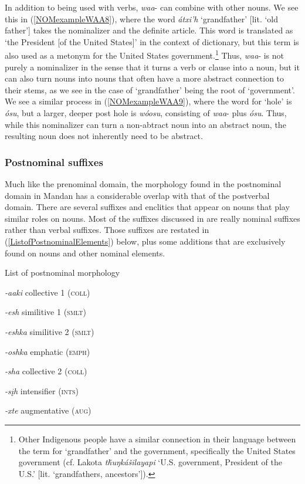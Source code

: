 In addition to being used with verbs, \textit{waa}- can combine with other nouns. We see this in (\ref{NOMexampleWAA8}), where the word \textit{átxi'h} `grandfather' [lit. `old father'] takes the nominalizer and the definite article. This word is translated as `the President [of the United States]' in the context of  dictionary, but this term is also used as a metonym for the United States government.\footnote{Other Indigenous people have a similar connection in their language between the term for `grandfather' and the government, specifically the United States government (cf. Lakota \textit{tȟuŋkášilayapi} `U.S. government, President of the U.S.' [lit. `grandfathers, ancestors']).} Thus, \textit{waa}- is not purely a nominalizer in the sense that it turns a verb or clause into a noun, but it can also turn nouns into nouns that often have a more abstract connection to their stems, as we see in the case of `grandfather' being the root of `government'. We see a similar process in (\ref{NOMexampleWAA9}), where the word for `hole' is \textit{ósu}, but a larger, deeper post hole is \textit{wóosu}, consisting of \textit{waa}- plus \textit{ósu}. Thus, while this nominalizer can turn a non-abtract noun into an abstract noun, the resulting noun does not inherently need to be abstract.


\subsubsection{Postnominal suffixes}\label{SubSubSecPostnominalDomain}

Much like the prenominal domain, the morphology found in the postnominal domain in Mandan has a considerable overlap with that of the postverbal domain. There are several suffixes and enclitics that appear on nouns that play similar roles on nouns. Most of the suffixes discussed in  are really nominal suffixes rather than verbal suffixes. Those suffixes are restated in (\ref{ListofPostnominalElements}) below, plus some additions that are exclusively found on nouns and other nominal elements.

\begin{exe}

\item\label{ListofPostnominalElements} List of postnominal morphology

    \begin{xlist}
\item \textit{-aaki} collective 1 (\textsc{coll})
\item \textit{-esh}	similitive 1 (\textsc{smlt})
\item \textit{-eshka} similitive 2 (\textsc{smlt})
\item \textit{-oshka} emphatic (\textsc{emph})
\item \textit{-sha}	collective 2 (\textsc{coll})
\item \textit{-sįh}	intensifier (\textsc{ints})
\item \textit{-xte}	augmentative (\textsc{aug})
    \end{xlist}

\end{exe}



